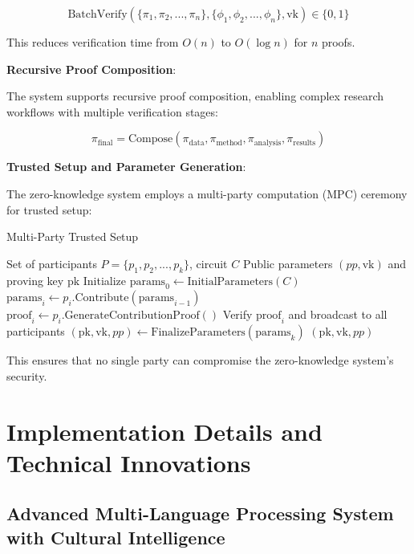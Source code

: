 \documentclass[10pt,twocolumn]{article}
\begin{document}
\begin{equation}
\text{BatchVerify}(\{\pi_1, \pi_2, ..., \pi_n\}, \{\phi_1, \phi_2, ..., \phi_n\}, \text{vk}) \in \{0, 1\}
\end{equation}

This reduces verification time from $O(n)$ to $O(\log n)$ for $n$ proofs.

\textbf{Recursive Proof Composition}:

The system supports recursive proof composition, enabling complex research workflows with multiple verification stages:

\begin{equation}
\pi_{\text{final}} = \text{Compose}(\pi_{\text{data}}, \pi_{\text{method}}, \pi_{\text{analysis}}, \pi_{\text{results}})
\end{equation}

\textbf{Trusted Setup and Parameter Generation}:

The zero-knowledge system employs a multi-party computation (MPC) ceremony for trusted setup:

\begin{algorithm}[H]
\caption{Multi-Party Trusted Setup}
\label{alg:trusted_setup}
\begin{algorithmic}[1]
\REQUIRE Set of participants $P = \{p_1, p_2, ..., p_k\}$, circuit $C$
\ENSURE Public parameters $(pp, \text{vk})$ and proving key $\text{pk}$
\STATE Initialize $\text{params}_0 \leftarrow \text{InitialParameters}(C)$
    \STATE $\text{params}_i \leftarrow p_i.\text{Contribute}(\text{params}_{i-1})$
    \STATE $\text{proof}_i \leftarrow p_i.\text{GenerateContributionProof}()$
    \STATE Verify $\text{proof}_i$ and broadcast to all participants
\ENDFOR
\STATE $(\text{pk}, \text{vk}, pp) \leftarrow \text{FinalizeParameters}(\text{params}_k)$
\RETURN $(\text{pk}, \text{vk}, pp)$
\end{algorithmic}
\end{algorithm}

This ensures that no single party can compromise the zero-knowledge system's security.

\section{Implementation Details and Technical Innovations}

\subsection{Advanced Multi-Language Processing System with Cultural Intelligence}
\end{document}
